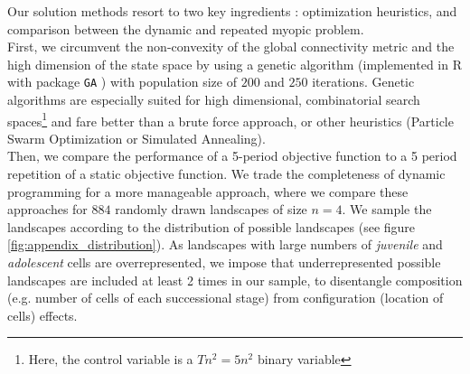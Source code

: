 Our solution methods resort to two key ingredients : optimization heuristics, and comparison between the dynamic and repeated myopic problem. \\
First, we circumvent the non-convexity of the global connectivity metric and the high dimension of the state space by using a genetic algorithm \citep{holland_adaptation_1975} (implemented in \textsf{R} with package \texttt{GA} \citep{GA_2017}) with population size of $200$ and $250$ iterations. Genetic algorithms are especially suited for high dimensional, combinatorial search spaces\footnote{Here, the control variable is a $Tn^2 = 5n^2$ binary variable} and fare better than a brute force approach, or other heuristics (Particle Swarm Optimization or Simulated Annealing). 
\\
Then, we compare the performance of a 5-period objective function to a 5 period repetition of a static objective function. We trade the completeness of dynamic programming for a more manageable approach, where we compare these approaches for %
$884$ randomly drawn landscapes of size $n=4$.
We sample the landscapes according to the 
distribution of possible landscapes (see figure \ref{fig:appendix_distribution}). As landscapes with large numbers of \textit{juvenile} and \textit{adolescent} cells are overrepresented, we impose that underrepresented possible landscapes are included at least 2 times in our sample, to disentangle composition (e.g. number of cells of each successional stage) from configuration (location of cells) effects.

